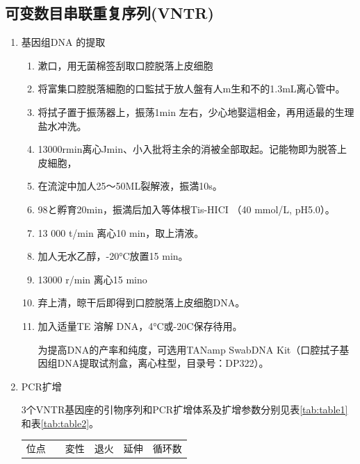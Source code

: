 \documentclass[AutoFakeBold]{LZUThesis}
\begin{document}
\subsection{可变数目串联重复序列(VNTR)}
\begin{enumerate}
    \item 基因组DNA 的提取\par
    \begin{enumerate}
        \item 漱口，用无菌棉签刮取口腔脱落上皮细胞\par
        \item 将富集口腔脱落細胞的口監拭于放人盤有人m生和不的1.3mL离心管中。\par
        \item 将拭子置于振荡器上，振荡1min 左右，少心地娶這相金，再用适最的生理盐水冲洗。\par
        \item 13000rmin离心Jmin、小入批将主余的消被全部取起。记能物即为脱答上皮細胞，\par
        \item 在流淀中加人25～50ML裂解液，振満10s。\par
        \item 98と孵育20min，振満后加入等体根Tis-HICI （40 mmol/L, pH5.0）。\par
        \item 13 000 t/min 离心10 min，取上清液。\par
        \item 加人无水乙醇，-20°C放置15 min。\par
        \item 13000 r/min 离心15 mino\par
        \item 弃上清，晾干后即得到口腔脱落上皮细胞DNA。\par
        \item 加入适量TE 溶解 DNA，4°C或-20C保存待用。\par
        为提高DNA的产率和纯度，可选用TANamp SwabDNA Kit（口腔拭子基因组DNA提取试剂盒，离心柱型，目录号：DP322）。\par
    \end{enumerate}
    \item PCR扩增\par
    3个VNTR基因座的引物序列和PCR扩增体系及扩增参数分别见表\ref{tab:table1}和表\ref{tab:table2}。\par
    \begin{longtable}{c|p{4.7cm}cccc}
        \toprule
        位点 & \centering{引物序列} & 変性 & 退火 & 延伸 & 循环数 \\

\end{longtable}
\end{enumerate}
\end{document}
